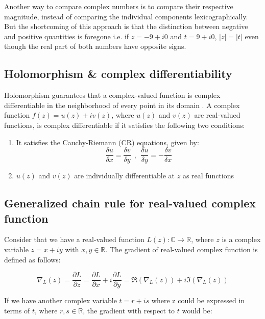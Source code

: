 Another way to compare complex numbers is to compare their respective magnitude, instead of comparing the individual components lexicographically. But the shortcoming of this approach is that the distinction between negative and positive quantities is foregone i.e. if $z=-9+i0$ and $t=9+i0$, $|z|=|t|$ even though the real part of both numbers have opposite signs.  

\subsection{Holomorphism \& complex differentiability}

Holomorphism guarantees that a complex-valued function is complex differentiable in the neighborhood of every point in its domain \cite{trabelsi2018deep}.
A complex function $f(z)= u(z) + iv(z)$, where $u(z)$ and $v(z)$ are real-valued functions, is complex differentiable if it satisfies the following two conditions:
\begin{enumerate}

	\item It satisfies the Cauchy-Riemann (CR) equations, given by:
\begin{equation}\label{eq:compdiff}
\frac{\delta u}{\delta x} = \frac{\delta v}{\delta y} ~~,~~ \frac{\delta u}{\delta y} = - \frac{\delta v}{\delta x} 
\end{equation}
	\item $u(z)$ and $v(z)$ are individually differentiable at $z$ as real functions	
\end{enumerate} 



\subsection{Generalized chain rule for real-valued complex  function}\label{cchainrule}
Consider that we have a real-valued function $L(z): \mathbb{C}\rightarrow\mathbb{R}$, where $z$ is a complex variable $z=x+iy$ with $x,y \in \mathbb{R}$. The gradient of real-valued complex function is defined as follows:
 
\begin{equation}\label{cvgrad}
\nabla_{L}(z) = \frac{\partial L}{\partial z} = \frac{\partial L}{\partial x} + i\frac{\partial L}{\partial y} = \Re(\nabla_{L}(z))+i\Im(\nabla_{L}(z))
\end{equation}

If we have another complex variable $t=r+is$ where z could be expressed in terms of $t$, where $r,s \in \mathbb{R}$, the gradient with respect to $t$ would be:

